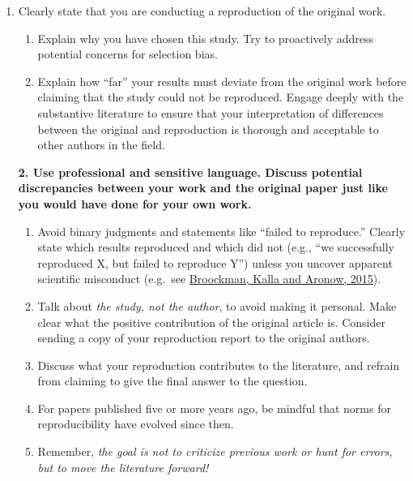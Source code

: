 \documentclass[]{book}
\providecommand{\tightlist}{%
  \setlength{\itemsep}{0pt}\setlength{\parskip}{0pt}}
\begin{document}
\begin{enumerate}
\def\labelenumi{\alph{enumi}.}
\tightlist
\item
  Clearly state that you are conducting a reproduction of the original work.

  \begin{enumerate}
  \def\labelenumii{\alph{enumii}.}
  \setcounter{enumii}{1}
  \tightlist
  \item
    Explain why you have chosen this study. Try to proactively address potential concerns for selection bias.\\
  \item
    Explain how ``far'' your results must deviate from the original work before claiming that the study could not be reproduced. Engage deeply with the substantive literature to ensure that your interpretation of differences between the original and reproduction is thorough and acceptable to other authors in the field.
  \end{enumerate}

  \textbf{2. Use professional and sensitive language. Discuss potential discrepancies between your work and the original paper just like you would have done for your own work.}

  \begin{enumerate}
  \def\labelenumii{\alph{enumii}.}
  \tightlist
  \item
    Avoid binary judgments and statements like ``failed to reproduce.'' Clearly state which results reproduced and which did not (e.g., ``we successfully reproduced X, but failed to reproduce Y'') unless you uncover apparent scientific misconduct (e.g.~see \href{https://osf.io/qy2se/}{Broockman, Kalla and Aronow, 2015}).\\
  \item
    Talk about \emph{the study, not the author}, to avoid making it personal. Make clear what the positive contribution of the original article is. Consider sending a copy of your reproduction report to the original authors.\\
  \item
    Discuss what your reproduction contributes to the literature, and refrain from claiming to give the final answer to the question.\\
  \item
    For papers published five or more years ago, be mindful that norms for reproducibility have evolved since then.\\
  \item
    Remember, \emph{the goal is not to criticize previous work or hunt for errors, but to move the literature forward!}
  \end{enumerate}
\end{enumerate}
\end{document}
